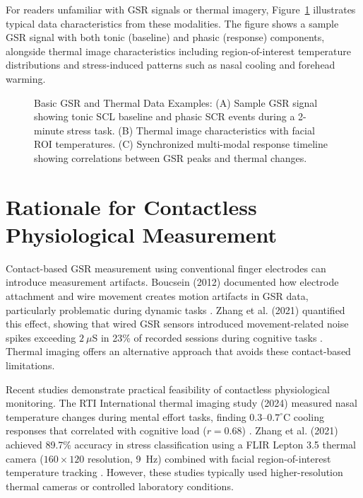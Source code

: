 \documentclass{report}
\begin{document}
For readers unfamiliar with GSR signals or thermal imagery, Figure~\ref{fig:gsr-thermal-examples} illustrates typical data characteristics from these modalities. The figure shows a sample GSR signal with both tonic (baseline) and phasic (response) components, alongside thermal image characteristics including region-of-interest temperature distributions and stress-induced patterns such as nasal cooling and forehead warming.

\begin{figure}[htbp]
    \centering
    \caption{Basic GSR and Thermal Data Examples: (A) Sample GSR signal showing tonic SCL baseline and phasic SCR events during a 2-minute stress task. (B) Thermal image characteristics with facial ROI temperatures. (C) Synchronized multi-modal response timeline showing correlations between GSR peaks and thermal changes.}
    \label{fig:gsr-thermal-examples}
\end{figure}

    \section{Rationale for Contactless Physiological Measurement}
    \label{sec:rationale_contactless}

    Contact-based GSR measurement using conventional finger electrodes can introduce measurement artifacts. Boucsein (2012) documented how electrode attachment and wire movement creates motion artifacts in GSR data, particularly problematic during dynamic tasks \cite{boucsein2012}. Zhang et al. (2021) quantified this effect, showing that wired GSR sensors introduced movement-related noise spikes exceeding $2~\mu$S in 23\% of recorded sessions during cognitive tasks \cite{zhang2021}. Thermal imaging offers an alternative approach that avoids these contact-based limitations.

    Recent studies demonstrate practical feasibility of contactless physiological monitoring. The RTI International thermal imaging study (2024) measured nasal temperature changes during mental effort tasks, finding $0.3$--$0.7^{\circ}$C cooling responses that correlated with cognitive load ($r = 0.68$) \cite{rti2024}. Zhang et al. (2021) achieved 89.7\% accuracy in stress classification using a FLIR Lepton 3.5 thermal camera ($160 \times 120$ resolution, 9~Hz) combined with facial region-of-interest temperature tracking \cite{zhang2021}. However, these studies typically used higher-resolution thermal cameras or controlled laboratory conditions.
\end{document}
